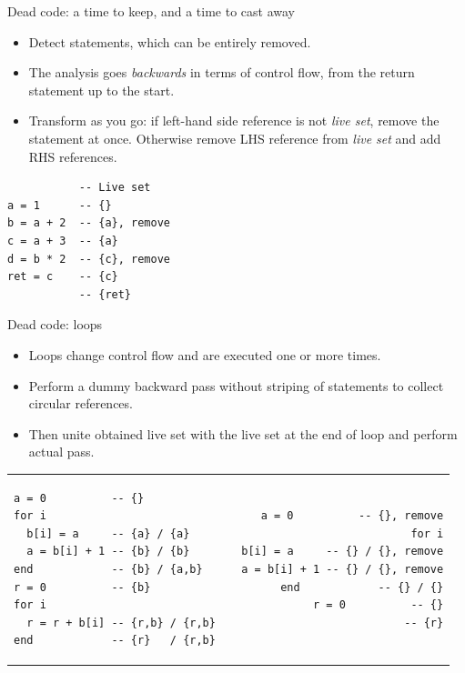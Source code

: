 \documentclass[handout]{beamer}
\begin{document}
\begin{frame}[fragile]{Dead code: a time to keep, and a time to cast away}

\begin{itemize}

\item Detect statements, which can be entirely removed.

\item The analysis goes {\em backwards} in terms of control flow, from the return statement up to the start.

\item Transform as you go: if left-hand side reference is not {\em live set}, remove the statement at once. Otherwise remove LHS reference from {\em live set} and add RHS references.

\end{itemize}

\begin{lstlisting}
           -- Live set
a = 1      -- {}
b = a + 2  -- {a}, remove
c = a + 3  -- {a}
d = b * 2  -- {c}, remove
ret = c    -- {c}
           -- {ret}
\end{lstlisting}

\end{frame}

\begin{frame}[fragile]{Dead code: loops}
\begin{adjustwidth}{-1em}{-1em}

\begin{itemize}
\item Loops change control flow and are executed one or more times.
\item Perform a dummy backward pass without striping of statements to collect circular references.
\item Then unite obtained live set with the live set at the end of loop and perform actual pass.
\end{itemize}

\bigskip

\begin{tabular}{l@{}r}

\begin{lstlisting}
a = 0          -- {}
for i
  b[i] = a     -- {a} / {a}
  a = b[i] + 1 -- {b} / {b}
end            -- {b} / {a,b}
r = 0          -- {b}
for i
  r = r + b[i] -- {r,b} / {r,b}
end            -- {r}   / {r,b}
\end{lstlisting}

&

\hspace{-1.5em}
\begin{lstlisting}
a = 0          -- {}, remove
for i
  b[i] = a     -- {} / {}, remove
  a = b[i] + 1 -- {} / {}, remove
end            -- {} / {}
r = 0          -- {}
               -- {r}
\end{lstlisting}

\end{tabular}

\end{adjustwidth}
\end{frame}
\end{document}
